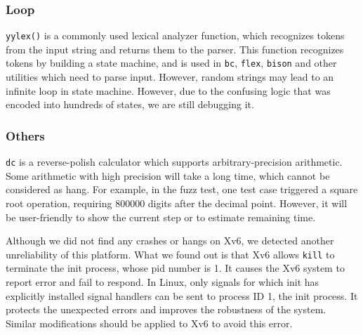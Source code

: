 \subsubsection{Loop}
\texttt{yylex()} is a commonly used lexical analyzer function, which recognizes tokens from the input string and returns them to the parser. This function recognizes tokens by building a state machine, and is used in \texttt{bc}, \texttt{flex}, \texttt{bison} and other utilities which need to parse input. However, random strings may lead to an infinite loop in state machine. However, due to the confusing logic that was encoded into hundreds of states, we are still debugging it.


\subsubsection{Others}
\texttt{dc} is a reverse-polish calculator which supports arbitrary-precision arithmetic. Some arithmetic with high precision will take a long time, which cannot be considered as hang. For example, in the fuzz test, one test case triggered a square root operation, requiring 800000 digits after the decimal point. However, it will be user-friendly to show the current step or to estimate remaining time.

Although we did not find any crashes or hangs on Xv6, we detected another unreliability of this platform. What we found out is that Xv6 allows \texttt{kill} to terminate the init process, whose pid number is 1. It causes the Xv6 system to report error and fail to respond. In Linux, only signals for which init has explicitly installed signal handlers can be sent to process ID 1, the init process\cite{KILL(2)}. It protects the unexpected errors and improves the robustness of the system. Similar modifications should be applied to Xv6 to avoid this error. 

